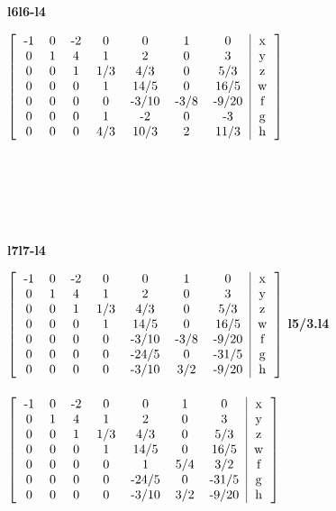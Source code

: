 \documentclass{article}
\begin{document}
\textbf{l6\rightarrow l6-l4}
\begin{hbox}{

$\left[
\begin{tabular}{ccccccc|c}
-1 & 0 & -2 & 0 & 0 & 1 & 0 & x\\
0 & 1 & 4 & 1 & 2 & 0 & 3 & y\\
0 & 0 & 1 & 1/3 & 4/3 & 0 & 5/3 & z\\
0 & 0 & 0 & 1 & 14/5 & 0 & 16/5 & w\\
0 & 0 & 0 & 0 & -3/10 & -3/8 & -9/20 & f\\
0 & 0 & 0 & 1 & -2 & 0 & -3 & g\\
0 & 0 & 0 & 4/3 & 10/3 & 2 & 11/3 & h\\
\end{tabular}
\right]
$}
\end{hbox}
\\\\\\\\\\
\textbf{l7\rightarrow l7-l4}
\begin{hbox}{

$\left[
\begin{tabular}{ccccccc|c}
-1 & 0 & -2 & 0 & 0 & 1 & 0 & x\\
0 & 1 & 4 & 1 & 2 & 0 & 3 & y\\
0 & 0 & 1 & 1/3 & 4/3 & 0 & 5/3 & z\\
0 & 0 & 0 & 1 & 14/5 & 0 & 16/5 & w\\
0 & 0 & 0 & 0 & -3/10 & -3/8 & -9/20 & f\\
0 & 0 & 0 & 0 & -24/5 & 0 & -31/5 & g\\
0 & 0 & 0 & 0 & -3/10 & 3/2 & -9/20 & h\\
\end{tabular}
\right]

$
\textbf{l5/3.l4}
\\\\
$\left[
\begin{tabular}{ccccccc|c}
-1 & 0 & -2 & 0 & 0 & 1 & 0 & x\\
0 & 1 & 4 & 1 & 2 & 0 & 3 & y\\
0 & 0 & 1 & 1/3 & 4/3 & 0 & 5/3 & z\\
0 & 0 & 0 & 1 & 14/5 & 0 & 16/5 & w\\
0 & 0 & 0 & 0 & 1 & 5/4 & 3/2 & f\\
0 & 0 & 0 & 0 & -24/5 & 0 & -31/5 & g\\
0 & 0 & 0 & 0 & -3/10 & 3/2 & -9/20 & h\\
\end{tabular}
\right]\\
$}
\end{hbox}\\
\end{document}
